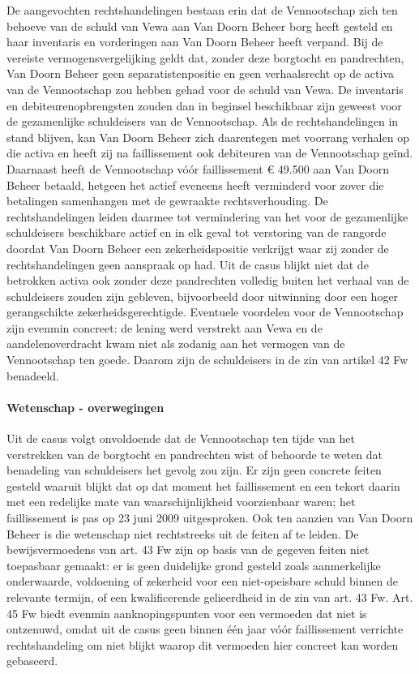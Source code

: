\documentclass[
  dutch,
  a4paper,
]{article}
\begin{document}
De aangevochten rechtshandelingen bestaan erin dat de Vennootschap zich ten behoeve van de schuld van Vewa aan Van Doorn Beheer borg heeft gesteld en haar inventaris en vorderingen aan Van Doorn Beheer heeft verpand. Bij de vereiste vermogensvergelijking geldt dat, zonder deze borgtocht en pandrechten, Van Doorn Beheer geen separatistenpositie en geen verhaalsrecht op de activa van de Vennootschap zou hebben gehad voor de schuld van Vewa. De inventaris en debiteurenopbrengsten zouden dan in beginsel beschikbaar zijn geweest voor de gezamenlijke schuldeisers van de Vennootschap. Als de rechtshandelingen in stand blijven, kan Van Doorn Beheer zich daarentegen met voorrang verhalen op die activa en heeft zij na faillissement ook debiteuren van de Vennootschap geïnd. Daarnaast heeft de Vennootschap vóór faillissement € 49.500 aan Van Doorn Beheer betaald, hetgeen het actief eveneens heeft verminderd voor zover die betalingen samenhangen met de gewraakte rechtsverhouding. De rechtshandelingen leiden daarmee tot vermindering van het voor de gezamenlijke schuldeisers beschikbare actief en in elk geval tot verstoring van de rangorde doordat Van Doorn Beheer een zekerheidspositie verkrijgt waar zij zonder de rechtshandelingen geen aanspraak op had. Uit de casus blijkt niet dat de betrokken activa ook zonder deze pandrechten volledig buiten het verhaal van de schuldeisers zouden zijn gebleven, bijvoorbeeld door uitwinning door een hoger gerangschikte zekerheidsgerechtigde. Eventuele voordelen voor de Vennootschap zijn evenmin concreet: de lening werd verstrekt aan Vewa en de aandelenoverdracht kwam niet als zodanig aan het vermogen van de Vennootschap ten goede. Daarom zijn de schuldeisers in de zin van artikel 42 Fw benadeeld.

\paragraph{Wetenschap - overwegingen}\label{wetenschap---overwegingen-1}

Uit de casus volgt onvoldoende dat de Vennootschap ten tijde van het verstrekken van de borgtocht en pandrechten wist of behoorde te weten dat benadeling van schuldeisers het gevolg zou zijn. Er zijn geen concrete feiten gesteld waaruit blijkt dat op dat moment het faillissement en een tekort daarin met een redelijke mate van waarschijnlijkheid voorzienbaar waren; het faillissement is pas op 23 juni 2009 uitgesproken. Ook ten aanzien van Van Doorn Beheer is die wetenschap niet rechtstreeks uit de feiten af te leiden. De bewijsvermoedens van art. 43 Fw zijn op basis van de gegeven feiten niet toepasbaar gemaakt: er is geen duidelijke grond gesteld zoals aanmerkelijke onderwaarde, voldoening of zekerheid voor een niet-opeisbare schuld binnen de relevante termijn, of een kwalificerende gelieerdheid in de zin van art. 43 Fw. Art. 45 Fw biedt evenmin aanknopingspunten voor een vermoeden dat niet is ontzenuwd, omdat uit de casus geen binnen één jaar vóór faillissement verrichte rechtshandeling om niet blijkt waarop dit vermoeden hier concreet kan worden gebaseerd.
\end{document}
